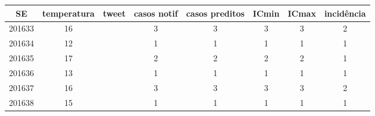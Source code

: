 \begin{tabular}{c|ccccccc}
  \hline
SE & temperatura & tweet & casos notif & casos preditos & ICmin & ICmax & incidência \\ 
  \hline
201633 & 16 &  & 3 & 3 & 3 & 3 & 2 \\ 
  201634 & 12 &  & 1 & 1 & 1 & 1 & 1 \\ 
  201635 & 17 &  & 2 & 2 & 2 & 2 & 1 \\ 
  201636 & 13 &  & 1 & 1 & 1 & 1 & 1 \\ 
  201637 & 16 &  & 3 & 3 & 3 & 3 & 2 \\ 
  201638 & 15 &  & 1 & 1 & 1 & 1 & 1 \\ 
   \hline
\end{tabular}
